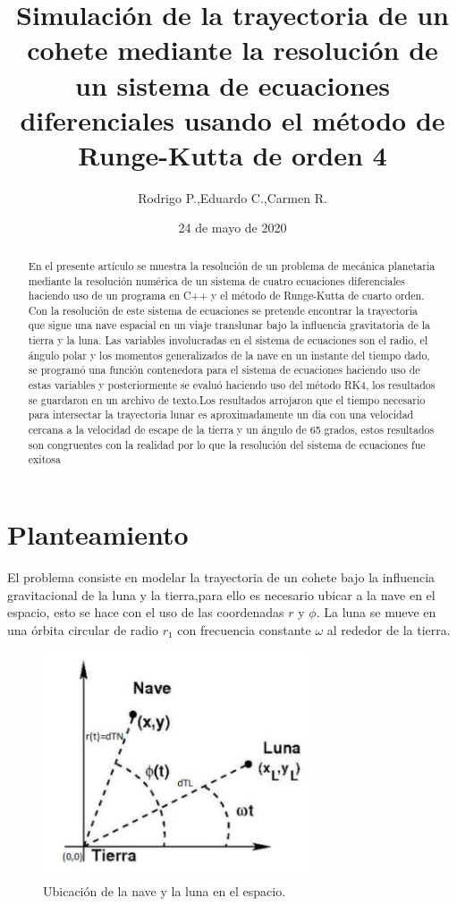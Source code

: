 \documentclass{article}
\title{Simulación de la trayectoria de un cohete mediante la resolución de un sistema de ecuaciones diferenciales usando el método de Runge-Kutta de orden 4}
\author{Rodrigo P.,Eduardo C.,Carmen R.}
\date{24 de mayo de 2020}
\begin{document}
\maketitle

\begin{abstract}
	En el presente artículo se muestra la resolución de un problema de mecánica planetaria mediante la resolución numérica de un sistema de cuatro ecuaciones diferenciales haciendo uso de un programa en C++ y el método de Runge-Kutta de cuarto orden. Con la resolución de este sistema de ecuaciones se pretende encontrar la trayectoria que sigue una nave espacial en un viaje translunar bajo la influencia gravitatoria de la tierra y la luna. Las variables involucradas en el sistema de ecuaciones son el radio, el ángulo polar y los momentos generalizados de la nave en un instante del tiempo dado, se programó una función contenedora para el sistema de ecuaciones haciendo uso de estas variables y posteriormente se evaluó haciendo uso del método RK4, los resultados se guardaron en un archivo de texto.Los resultados arrojaron que el tiempo necesario para intersectar la trayectoria lunar es aproximadamente un dia con una velocidad cercana a la velocidad de escape de la tierra y un ángulo de 65 grados, estos resultados son congruentes con la realidad por lo que la resolución del sistema de ecuaciones fue exitosa
\end{abstract}

\section{Planteamiento}

El problema consiste en modelar la trayectoria de un cohete bajo la influencia gravitacional de la luna y la tierra,para ello es necesario ubicar a la nave en el espacio, esto se hace con el uso de las coordenadas $r$ y $\phi$. La luna se mueve en una órbita circular de radio $r_1$ con frecuencia constante $\omega$ al rededor de la tierra.\\

\begin{figure}[H]
	\centering
	\includegraphics[width=8cm]{Sistema}
	\caption{Ubicación de la nave y la luna en el espacio.}
\end{figure}
\end{document}
